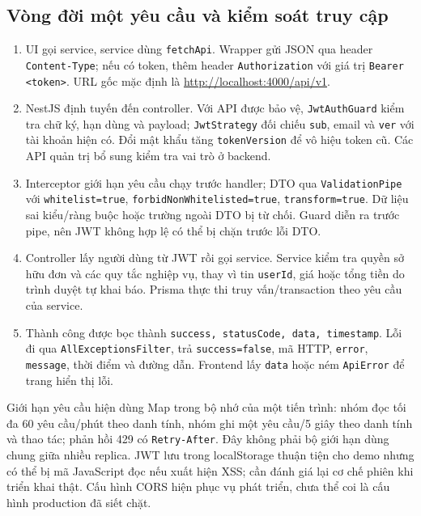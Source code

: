 \subsection{Vòng đời một yêu cầu và kiểm soát truy cập}

\begin{enumerate}[leftmargin=*,itemsep=3pt]
  \item UI gọi service, service dùng \texttt{fetchApi}. Wrapper gửi JSON qua header \texttt{Content-Type}; nếu có token, thêm header \texttt{Authorization} với giá trị \texttt{Bearer <token>}. URL gốc mặc định là \url{http://localhost:4000/api/v1}.
  \item NestJS định tuyến đến controller. Với API được bảo vệ, \texttt{JwtAuthGuard} kiểm tra chữ ký, hạn dùng và payload; \texttt{JwtStrategy} đối chiếu \texttt{sub}, email và \texttt{ver} với tài khoản hiện có. Đổi mật khẩu tăng \texttt{tokenVersion} để vô hiệu token cũ. Các API quản trị bổ sung kiểm tra vai trò ở backend.
  \item Interceptor giới hạn yêu cầu chạy trước handler; DTO qua \texttt{ValidationPipe} với \texttt{whitelist=true}, \texttt{forbidNonWhitelisted=true}, \texttt{transform=true}. Dữ liệu sai kiểu/ràng buộc hoặc trường ngoài DTO bị từ chối. Guard diễn ra trước pipe, nên JWT không hợp lệ có thể bị chặn trước lỗi DTO.
  \item Controller lấy người dùng từ JWT rồi gọi service. Service kiểm tra quyền sở hữu đơn và các quy tắc nghiệp vụ, thay vì tin \texttt{userId}, giá hoặc tổng tiền do trình duyệt tự khai báo. Prisma thực thi truy vấn/transaction theo yêu cầu của service.
  \item Thành công được bọc thành \texttt{success, statusCode, data, timestamp}. Lỗi đi qua \texttt{AllExceptionsFilter}, trả \texttt{success=false}, mã HTTP, \texttt{error}, \texttt{message}, thời điểm và đường dẫn. Frontend lấy \texttt{data} hoặc ném \texttt{ApiError} để trang hiển thị lỗi.
\end{enumerate}

Giới hạn yêu cầu hiện dùng Map trong bộ nhớ của một tiến trình: nhóm đọc tối đa 60 yêu cầu/phút theo danh tính, nhóm ghi một yêu cầu/5 giây theo danh tính và thao tác; phản hồi 429 có \texttt{Retry-After}. Đây không phải bộ giới hạn dùng chung giữa nhiều replica. JWT lưu trong localStorage thuận tiện cho demo nhưng có thể bị mã JavaScript đọc nếu xuất hiện XSS; cần đánh giá lại cơ chế phiên khi triển khai thật. Cấu hình CORS hiện phục vụ phát triển, chưa thể coi là cấu hình production đã siết chặt.

